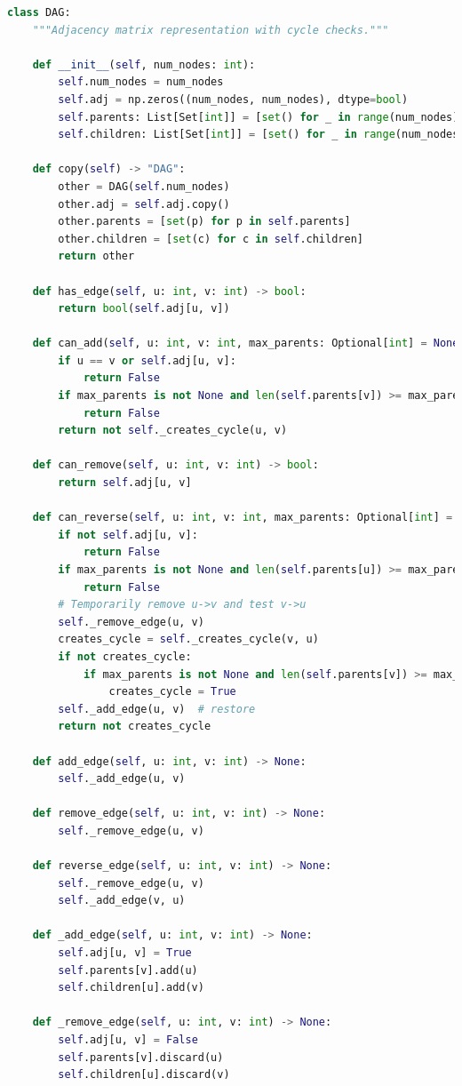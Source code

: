 \documentclass[twoside,11pt]{article}
\begin{document}
\begin{algorithm}
\begin{lstlisting}[language=Python]
class DAG:
    """Adjacency matrix representation with cycle checks."""

    def __init__(self, num_nodes: int):
        self.num_nodes = num_nodes
        self.adj = np.zeros((num_nodes, num_nodes), dtype=bool)
        self.parents: List[Set[int]] = [set() for _ in range(num_nodes)]
        self.children: List[Set[int]] = [set() for _ in range(num_nodes)]

    def copy(self) -> "DAG":
        other = DAG(self.num_nodes)
        other.adj = self.adj.copy()
        other.parents = [set(p) for p in self.parents]
        other.children = [set(c) for c in self.children]
        return other

    def has_edge(self, u: int, v: int) -> bool:
        return bool(self.adj[u, v])

    def can_add(self, u: int, v: int, max_parents: Optional[int] = None) -> bool:
        if u == v or self.adj[u, v]:
            return False
        if max_parents is not None and len(self.parents[v]) >= max_parents:
            return False
        return not self._creates_cycle(u, v)

    def can_remove(self, u: int, v: int) -> bool:
        return self.adj[u, v]

    def can_reverse(self, u: int, v: int, max_parents: Optional[int] = None) -> bool:
        if not self.adj[u, v]:
            return False
        if max_parents is not None and len(self.parents[u]) >= max_parents:
            return False
        # Temporarily remove u->v and test v->u
        self._remove_edge(u, v)
        creates_cycle = self._creates_cycle(v, u)
        if not creates_cycle:
            if max_parents is not None and len(self.parents[v]) >= max_parents:
                creates_cycle = True
        self._add_edge(u, v)  # restore
        return not creates_cycle

    def add_edge(self, u: int, v: int) -> None:
        self._add_edge(u, v)

    def remove_edge(self, u: int, v: int) -> None:
        self._remove_edge(u, v)

    def reverse_edge(self, u: int, v: int) -> None:
        self._remove_edge(u, v)
        self._add_edge(v, u)

    def _add_edge(self, u: int, v: int) -> None:
        self.adj[u, v] = True
        self.parents[v].add(u)
        self.children[u].add(v)

    def _remove_edge(self, u: int, v: int) -> None:
        self.adj[u, v] = False
        self.parents[v].discard(u)
        self.children[u].discard(v)


\end{lstlisting}
\end{algorithm}
\end{document}
